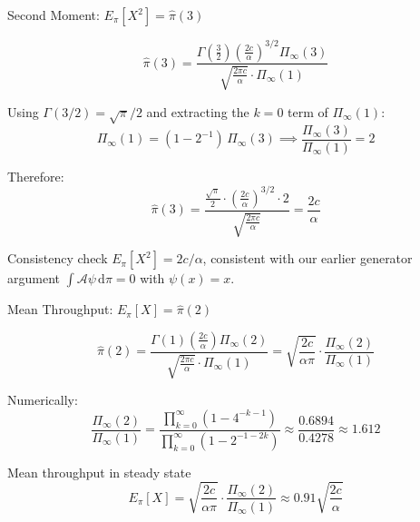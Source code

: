 \documentclass[aspectratio=169]{beamer}
\begin{document}
\begin{frame}{Second Moment: $E_\pi[X^2] = \hat{\pi}(3)$}

  \[
    \hat{\pi}(3) =
    \frac{\Gamma\!\left(\frac{3}{2}\right)
          \left(\frac{2c}{\alpha}\right)^{3/2}
          \Pi_\infty(3)}
         {\sqrt{\frac{2\pi c}{\alpha}}\cdot\Pi_\infty(1)}
  \]

  \bigskip
  Using $\Gamma(3/2) = \sqrt{\pi}/2$ and extracting the
  $k=0$ term of $\Pi_\infty(1)$:
  \[
    \Pi_\infty(1) = (1-2^{-1})\,\Pi_\infty(3)
    \implies
    \frac{\Pi_\infty(3)}{\Pi_\infty(1)} = 2
  \]

  \bigskip
  Therefore:
  \[
    \hat{\pi}(3) =
    \frac{\frac{\sqrt{\pi}}{2}\cdot
          \left(\frac{2c}{\alpha}\right)^{3/2}\cdot 2}
         {\sqrt{\frac{2\pi c}{\alpha}}}
    = \frac{2c}{\alpha}
  \]

  \alert{Consistency check} $E_\pi[X^2] = 2c/\alpha$, consistent with our earlier
    generator argument $\int\mathcal{A}\psi\,\mathrm{d}\pi = 0$ with $\psi(x) = x$. \checkmark

\end{frame}

\begin{frame}{Mean Throughput: $E_\pi[X] = \hat{\pi}(2)$}

  \[
    \hat{\pi}(2) =
    \frac{\Gamma(1)\left(\frac{2c}{\alpha}\right)\Pi_\infty(2)}
         {\sqrt{\frac{2\pi c}{\alpha}}\cdot\Pi_\infty(1)}
    = \sqrt{\frac{2c}{\alpha\pi}}\cdot
      \frac{\Pi_\infty(2)}{\Pi_\infty(1)}
  \]

  \bigskip
  Numerically:
  \[
    \frac{\Pi_\infty(2)}{\Pi_\infty(1)}
    = \frac{\prod_{k=0}^\infty(1-4^{-k-1})}
           {\prod_{k=0}^\infty(1-2^{-1-2k})}
    \approx \frac{0.6894}{0.4278} \approx 1.612
  \]

  \bigskip
  \begin{block}{Mean throughput in steady state}
    \[
      \boxed{
        E_\pi[X] = \sqrt{\frac{2c}{\alpha\pi}}\cdot
        \frac{\Pi_\infty(2)}{\Pi_\infty(1)}
        \approx 0.91\sqrt{\frac{2c}{\alpha}}
      }
    \]
  \end{block}

\end{frame}
\end{document}
